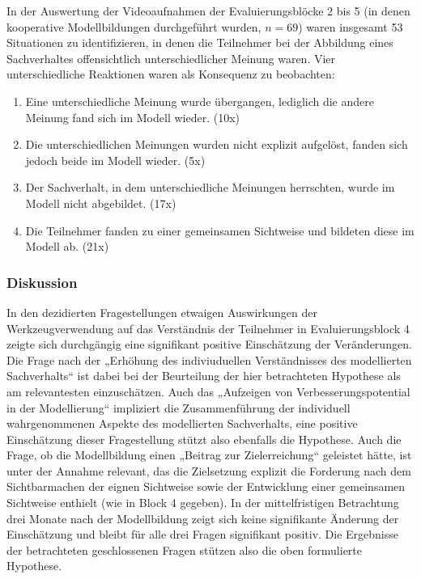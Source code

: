 In der Auswertung der Videoaufnahmen der Evaluierungsblöcke 2 bis 5 (in denen kooperative Modellbildungen durchgeführt wurden, $n=69$) waren insgesamt 53 Situationen zu identifizieren, in denen die Teilnehmer bei der Abbildung eines Sachverhaltes offensichtlich unterschiedlicher Meinung waren. Vier unterschiedliche Reaktionen waren als Konsequenz zu beobachten:
\begin{enumerate}
	\item Eine unterschiedliche Meinung wurde übergangen, lediglich die andere Meinung fand sich im Modell wieder. (10x)
	\item Die unterschiedlichen Meinungen wurden nicht explizit aufgelöst, fanden sich jedoch beide im Modell wieder. (5x)
	\item Der Sachverhalt, in dem unterschiedliche Meinungen herrschten, wurde im Modell nicht abgebildet. (17x)
	\item Die Teilnehmer fanden zu einer gemeinsamen Sichtweise und bildeten diese im Modell ab. (21x)
\end{enumerate}
  
\subsubsection{Diskussion} 

In den dezidierten Fragestellungen etwaigen Auswirkungen der Werkzeugverwendung auf das Verständnis der Teilnehmer in Evaluierungsblock 4 zeigte sich durchgängig eine signifikant positive Einschätzung der Veränderungen. Die Frage nach der „Erhöhung des indiviuduellen Verständnisses des modellierten Sachverhalts“ ist dabei bei der Beurteilung der hier betrachteten Hypothese als am relevantesten einzuschätzen. Auch das „Aufzeigen von Verbesserungspotential in der Modellierung“ impliziert die Zusammenführung der individuell wahrgenommenen Aspekte des modellierten Sachverhalts, eine positive Einschätzung dieser Fragestellung stützt also ebenfalls die Hypothese. Auch die Frage, ob die Modellbildung einen „Beitrag zur Zielerreichung“ geleistet hätte, ist unter der Annahme relevant, das die Zielsetzung explizit die Forderung nach dem Sichtbarmachen der eignen Sichtweise sowie der Entwicklung einer gemeinsamen Sichtweise enthielt (wie in Block 4 gegeben). In der mittelfristigen Betrachtung drei Monate nach der Modellbildung zeigt sich keine signifikante Änderung der Einschätzung und bleibt für alle drei Fragen signifikant positiv. Die Ergebnisse der betrachteten geschlossenen Fragen stützen also die oben formulierte Hypothese.

